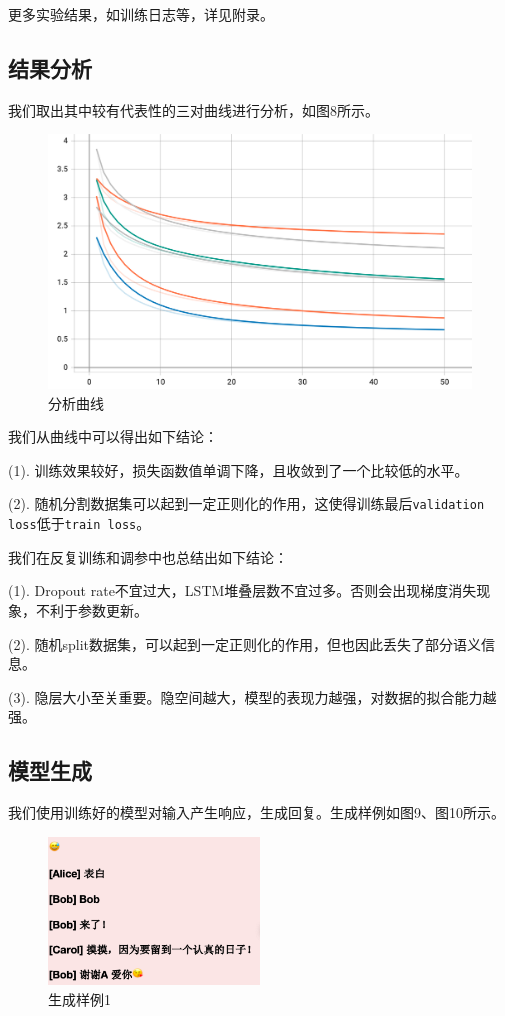 \documentclass[12pt,a4paper]{article}
\begin{document}
更多实验结果，如训练日志等，详见附录。

\subsection{结果分析}
我们取出其中较有代表性的三对曲线进行分析，如图8所示。

\begin{figure}[!h]
        \centering
        \includegraphics[width=1\textwidth]{图片10.png}
        \caption{分析曲线}
\end{figure}

我们从曲线中可以得出如下结论：

(1). 训练效果较好，损失函数值单调下降，且收敛到了一个比较低的水平。

(2). 随机分割数据集可以起到一定正则化的作用，这使得训练最后\verb|validation loss|低于\verb|train loss|。

我们在反复训练和调参中也总结出如下结论：

(1). Dropout rate不宜过大，LSTM堆叠层数不宜过多。否则会出现梯度消失现象，不利于参数更新。

(2). 随机split数据集，可以起到一定正则化的作用，但也因此丢失了部分语义信息。

(3). 隐层大小至关重要。隐空间越大，模型的表现力越强，对数据的拟合能力越强。

\subsection{模型生成}

我们使用训练好的模型对输入产生响应，生成回复。生成样例如图9、图10所示。

\begin{figure}[!h]
        \centering
        \includegraphics[width=0.5\textwidth]{回复1.png}
        \caption{生成样例1}
\end{figure}
\end{document}
